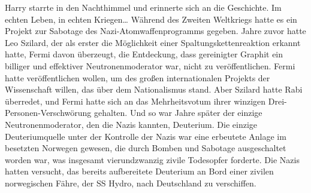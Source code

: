 Harry starrte in den Nachthimmel und erinnerte sich an die Geschichte.
Im echten Leben, in echten Kriegen…
Während des Zweiten Weltkriegs hatte es ein Projekt zur Sabotage des Nazi-Atomwaffenprogramms gegeben. Jahre zuvor hatte Leo Szilard, der als erster die Möglichkeit einer Spaltungskettenreaktion erkannt hatte, Fermi davon überzeugt, die Entdeckung, dass gereinigter Graphit ein billiger und effektiver Neutronenmoderator war, nicht zu veröffentlichen. Fermi hatte veröffentlichen wollen, um des großen internationalen Projekts der Wissenschaft willen, das über dem Nationalismus stand. Aber Szilard hatte Rabi überredet, und Fermi hatte sich an das Mehrheitsvotum ihrer winzigen Drei-Personen-Verschwörung gehalten. Und so war Jahre später der einzige Neutronenmoderator, den die Nazis kannten, Deuterium.
Die einzige Deuteriumquelle unter der Kontrolle der Nazis war eine erbeutete Anlage im besetzten Norwegen gewesen, die durch Bomben und Sabotage ausgeschaltet worden war, was insgesamt vierundzwanzig zivile Todesopfer forderte.
Die Nazis hatten versucht, das bereits aufbereitete Deuterium an Bord einer zivilen norwegischen Fähre, der SS Hydro, nach Deutschland zu verschiffen.
